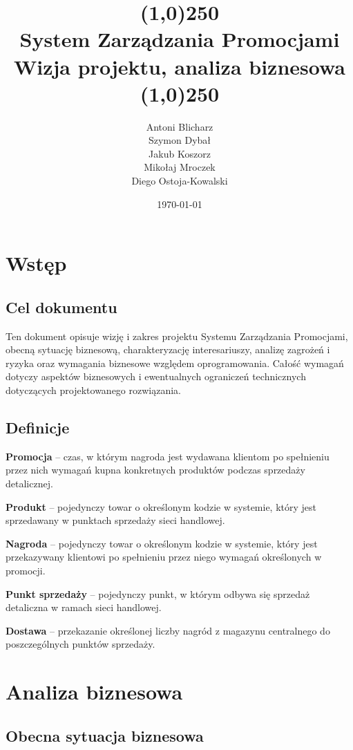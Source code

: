\documentclass[a4paper,12pt]{article}
\title{
    \line(1,0){250}\\
    System Zarządzania Promocjami\\
    Wizja projektu, analiza biznesowa\\
    \line(1,0){250}}
\author{Antoni Blicharz\\
        Szymon Dybał\\
        Jakub Koszorz\\
        Mikołaj Mroczek\\
        Diego Ostoja-Kowalski\\}
\date{\today}
\begin{document}
\begin{titlepage}
    \maketitle
\end{titlepage}
\newpage

\section{Wstęp}

\subsection{Cel dokumentu}

Ten dokument opisuje wizję i zakres projektu Systemu Zarządzania Promocjami, obecną sytuację biznesową, charakteryzację interesariuszy, analizę zagrożeń i ryzyka oraz wymagania biznesowe względem oprogramowania.
Całość wymagań dotyczy aspektów biznesowych i ewentualnych ograniczeń technicznych dotyczących projektowanego rozwiązania.

\subsection{Definicje}

\textbf{Promocja} -- czas, w którym nagroda jest wydawana klientom po spełnieniu przez nich wymagań kupna konkretnych produktów podczas sprzedaży detalicznej.

\textbf{Produkt} -- pojedynczy towar o określonym kodzie w systemie, który jest sprzedawany w punktach sprzedaży sieci handlowej.

\textbf{Nagroda} -- pojedynczy towar o określonym kodzie w systemie, który jest przekazywany klientowi po spełnieniu przez niego wymagań określonych w promocji.

\textbf{Punkt sprzedaży} -- pojedynczy punkt, w którym odbywa się sprzedaż detaliczna w ramach sieci handlowej.

\textbf{Dostawa} -- przekazanie określonej liczby nagród z magazynu centralnego do poszczególnych punktów sprzedaży.

\section{Analiza biznesowa}

\subsection{Obecna sytuacja biznesowa}
\end{document}
